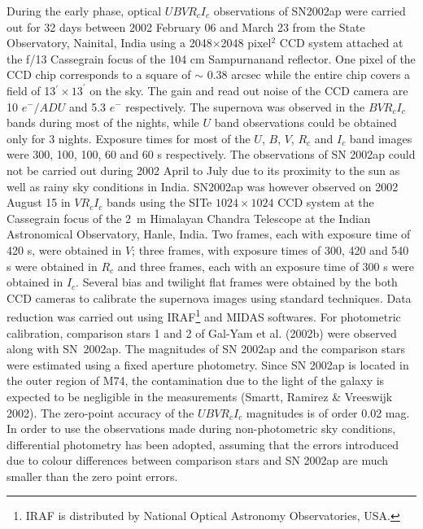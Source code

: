 During the early phase, optical $UBVR_cI_c$ observations of SN2002ap were 
carried out for 32 days between 2002 February 06 and March 23 from the State 
Observatory, Nainital, India using a 2048$\times$2048 pixel$^2$ CCD system 
attached at the f/13 Cassegrain focus of the 104 cm Sampurnanand reflector. 
One pixel of the CCD chip corresponds to a square of $\sim$ 0.38 arcsec while the 
entire chip covers
a field of 13$ ^ \prime \times 13^ \prime$ on the sky. The gain and read out noise of
the CCD camera are 10 $e^-/ADU$ and 5.3 $e^-$ respectively. The supernova
was observed in the $BVR_cI_c$ bands during most of the nights, while $U$ band
observations could be obtained only for 3 nights. Exposure times for most
of the $U$, $B$, $V$, $R_c$ and $I_c$ band images were 300, 100, 100, 60 and 60
s respectively. The observations of SN 2002ap could not be carried out during 2002 April
 to July due to its proximity to the sun as well as rainy sky conditions in India.
SN2002ap was however observed on 2002 August 15 in $VR_cI_c$ bands using the SITe $1024 \times 1024$ CCD 
system at the Cassegrain focus of the 2~m Himalayan Chandra Telescope at the 
Indian Astronomical Observatory, Hanle, India. Two frames, each with exposure 
time of 420 s, were obtained in $V$; three frames, with exposure times of 300, 420 and 
540 s were obtained in $R_c$ and three frames, each with an exposure time of 300 s
were obtained in $I_c$. Several bias and twilight flat frames were
obtained by the both CCD cameras to calibrate the supernova images using standard techniques. Data
reduction was carried out using IRAF\footnote{IRAF is distributed by National 
Optical Astronomy Observatories, USA.} and MIDAS softwares. For photometric
calibration, comparison stars 1 and 2 of Gal-Yam et al. (2002b)
were observed along with SN~2002ap.  The magnitudes of SN 2002ap and the
comparison stars were estimated using a fixed aperture photometry. 
Since SN 2002ap is located in the outer
region of M74, the contamination due to the light of the galaxy is expected
to be negligible in the measurements (Smartt, Ramirez \& Vreeswijk 2002).
The zero-point accuracy of the $UBVR_cI_c$ magnitudes is of order 0.02
mag.  In order to use the observations made during non-photometric sky
conditions, differential photometry has been adopted, assuming that the errors
introduced due to colour differences between comparison stars and SN
2002ap are much smaller than the zero point errors. 

